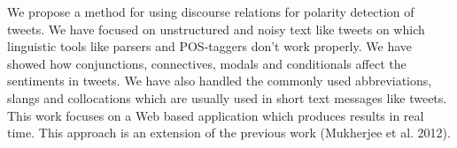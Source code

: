 We propose a method for using discourse relations for polarity detection of tweets. We have focused on unstructured and noisy text like tweets on which
 linguistic tools like parsers and POS-taggers don't work properly. We have
 showed how conjunctions, connectives, modals and conditionals affect the
 sentiments in tweets. We have also handled the commonly used abbreviations,
 slangs and  collocations which are usually used in short text messages like
 tweets. This work focuses on a Web based application which produces results in
 real time. This approach is an extension of the previous work (Mukherjee et al.
 2012).

